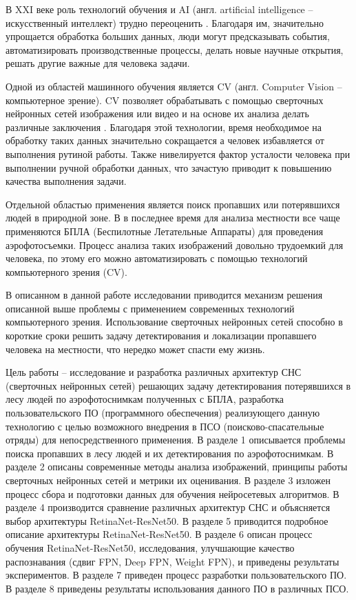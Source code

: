 
В XXI веке роль технологий обучения и AI (англ. artificial intelligence -- искусственный интеллект) трудно переоценить \cite{lib-sidorenko}. Благодаря им, значительно упрощается обработка больших данных, люди могут предсказывать события, автоматизировать производственные процессы, делать новые научные открытия, решать другие важные для человека задачи.

Одной из областей машинного обучения является CV (англ. Computer Vision -- компьютерное зрение). CV позволяет обрабатывать с помощью сверточных нейронных сетей изображения или видео и на основе их анализа делать различные заключения \cite{lib-deep-learning-book}. Благодаря этой технологии, время необходимое на обработку таких данных значительно сокращается а человек избавляется от выполнения рутиной работы. Также нивелируется фактор усталости человека при выполнении ручной обработки данных, что зачастую приводит к повышению качества выполнения задачи.

Отдельной областью применения является поиск пропавших или потерявшихся людей в природной зоне. В в последнее время для анализа местности все чаще применяются БПЛА (Беспилотные Летательные Аппараты) для проведения аэрофотосъемки. Процесс анализа таких изображений довольно трудоемкий для человека, по этому его можно автоматизировать с помощью технологий компьютерного зрения (CV). 

В описанном в данной работе исследовании приводится механизм решения описанной выше проблемы с применением современных технологий компьютерного зрения. Использование сверточных нейронных сетей способно в короткие сроки решить задачу детектирования и локализации пропавшего человека на местности, что нередко может спасти ему жизнь. 

Цель работы -- исследование и разработка различных архитектур СНС (сверточных нейронных сетей) решающих задачу детектирования потерявшихся в лесу людей по аэрофотоснимкам полученных с БПЛА, разработка пользовательского ПО (программного обеспечения) реализующего данную технологию с целью возможного внедрения в ПСО (поисково-спасательные отряды) для непосредственного применения. В разделе 1 описывается проблемы поиска пропавших в лесу людей и их детектирования по аэрофотоснимкам. В разделе 2 описаны современные методы анализа изображений, принципы работы сверточных нейронных сетей и метрики их оценивания. В разделе 3 изложен процесс сбора и подготовки данных для обучения нейросетевых алгоритмов. В разделе 4 производится сравнение различных архитектур СНС и объясняется выбор архитектуры RetinaNet-ResNet50. В разделе 5 приводится подробное описание архитектуры RetinaNet-ResNet50. В разделе 6 описан процесс обучения RetinaNet-ResNet50, исследования, улучшающие качество распознавания (сдвиг FPN, Deep FPN, Weight FPN), и приведены результаты экспериментов. В разделе 7 приведен процесс разработки пользовательского ПО. В разделе 8 приведены результаты использования данного ПО в различных ПСО.
\clearpage